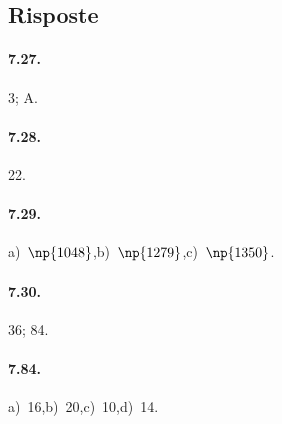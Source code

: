 \subsection{Risposte}

\paragraph{7.27.} 3; A.

\paragraph{7.28.} 22.

\paragraph{7.29.} a)~$\np{1048}$,\quad b)~$\np{1279}$,\quad c)~$\np{1350}$.

\paragraph{7.30.} 36; 84.

\paragraph{7.84.} a)~16,\quad b)~20,\quad c)~10,\quad d)~14.

